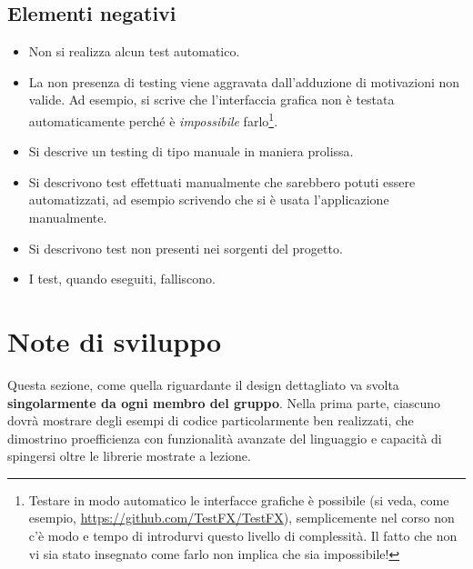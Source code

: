 \documentclass[a4paper,12pt]{report}
\begin{document}
	\subsection*{Elementi negativi}
	\begin{itemize}
		\item Non si realizza alcun test automatico.
		\item La non presenza di testing viene aggravata dall'adduzione di motivazioni non valide. Ad esempio, si scrive che l'interfaccia grafica non è testata automaticamente perché è \emph{impossibile} farlo\footnote{Testare in modo automatico le interfacce grafiche è possibile (si veda, come esempio, \url{https://github.com/TestFX/TestFX}), semplicemente nel corso non c'è modo e tempo di introdurvi questo livello di complessità. Il fatto che non vi sia stato insegnato come farlo non implica che sia impossibile!}.
		\item Si descrive un testing di tipo manuale in maniera prolissa.
		\item Si descrivono test effettuati manualmente che sarebbero potuti essere automatizzati, ad esempio scrivendo che si è usata l'applicazione manualmente.
		\item Si descrivono test non presenti nei sorgenti del progetto.
		\item I test, quando eseguiti, falliscono.
	\end{itemize}
	
	\section{Note di sviluppo}
	
	Questa sezione, come quella riguardante il design dettagliato va svolta \textbf{singolarmente da ogni membro del gruppo}.
	Nella prima parte, ciascuno dovrà mostrare degli esempi di codice particolarmente ben realizzati,
	che dimostrino proefficienza con funzionalità avanzate del linguaggio e capacità di spingersi oltre le librerie mostrate a lezione.
	
\end{document}
